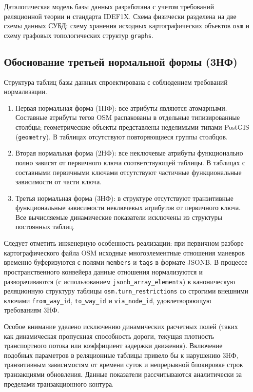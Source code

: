 Даталогическая модель базы данных разработана с учетом требований реляционной теории и стандарта IDEF1X. Схема физически разделена на две схемы данных СУБД: схему хранения исходных картографических объектов \texttt{osm} и схему графовых топологических структур \texttt{graphs}.

\subsection{Обоснование третьей нормальной формы (3НФ)}

Структура таблиц базы данных спроектирована с соблюдением требований нормализации.
\begin{enumerate}
    \item Первая нормальная форма (1НФ): все атрибуты являются атомарными. Составные атрибуты тегов OSM распакованы в отдельные типизированные столбцы; геометрические объекты представлены неделимыми типами PostGIS (\texttt{geometry}). В таблицах отсутствуют повторяющиеся группы столбцов.
    \item Вторая нормальная форма (2НФ): все неключевые атрибуты функционально полно зависят от первичного ключа соответствующей таблицы. В таблицах с составными первичными ключами отсутствуют частичные функциональные зависимости от части ключа.
    \item Третья нормальная форма (3НФ): в структуре отсутствуют транзитивные функциональные зависимости неключевых атрибутов от первичного ключа. Все вычисляемые динамические показатели исключены из структуры постоянных таблиц.
\end{enumerate}

Следует отметить инженерную особенность реализации: при первичном разборе картографического файла OSM исходные многоэлементные отношения маневров временно буферизуются с полями \texttt{members} и \texttt{tags} в формате JSONB. В процессе пространственного конвейера данные отношения нормализуются и разворачиваются (с использованием \texttt{jsonb\_array\_elements}) в каноническую реляционную структуру таблицы \texttt{osm.turn\_restrictions} со строгими внешними ключами \texttt{from\_way\_id}, \texttt{to\_way\_id} и \texttt{via\_node\_id}, удовлетворяющую требованиям 3НФ.

Особое внимание уделено исключению динамических расчетных полей (таких как динамическая пропускная способность дороги, текущая плотность транспортного потока или коэффициент задержки движения). Включение подобных параметров в реляционные таблицы привело бы к нарушению 3НФ, транзитивным зависимостям от времени суток и непрерывной блокировке строк транзакциями обновления. Данные показатели рассчитываются аналитически за пределами транзакционного контура.

